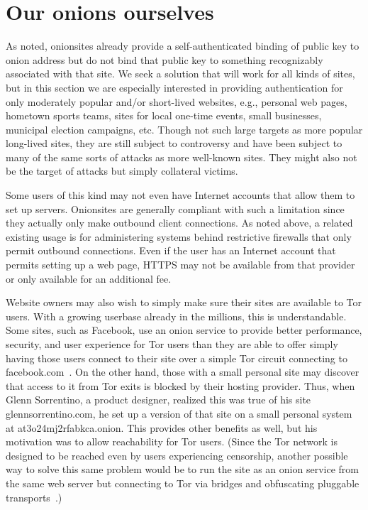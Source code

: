\documentclass[10pt, conference, compsocconf]{styles/IEEEtran}
\begin{document}
\section{Our onions ourselves}
\label{ourselves}

As noted, onionsites already provide a self-authenticated binding of
public key to onion address but do not bind that public key to
something recognizably associated with that site.  We seek a solution
that will work for all kinds of sites, but in this section we are
especially interested in providing authentication for only moderately
popular and/or short-lived websites, e.g., personal web pages,
hometown sports teams, sites for local one-time events, small
businesses, municipal election campaigns, etc.  Though not such large
targets as more popular long-lived sites, they are still subject to
controversy and have been subject to many of the same sorts of attacks
as more well-known sites.  They might also not be the target of
attacks but simply collateral victims.

Some users of this kind may not even have Internet accounts that allow
them to set up servers. Onionsites are generally compliant with such a
limitation since they actually only make outbound client
connections. As noted above, a related existing usage is for
administering systems behind restrictive firewalls that only permit
outbound connections.  Even if the user has an Internet account that
permits setting up a web page, HTTPS may not be available from that
provider or only available for an additional fee.

Website owners may also wish to simply make sure their sites are
available to Tor users. With a growing userbase already in the
millions, this is understandable.  Some sites, such as Facebook, use an
onion service to provide better performance, security, and user
experience for Tor users than they are able to offer simply having
those users connect to their site over a simple Tor circuit connecting
to facebook.com~\cite{7686-and-all}. On the other hand, those with a
small personal site may discover that access to it from Tor exits is
blocked by their hosting provider.  Thus, when Glenn Sorrentino, a
product designer, realized this was true of his site glennsorrentino.com,
he set up a version of that site on a small personal system at
at3o24mj2rfabkca.onion. This provides other benefits as well, but his
motivation was to allow reachability for Tor users. (Since the Tor network
is designed to be reached even by users experiencing censorship,
another possible way to solve this same problem would be to run the
site as an onion service from the same web server but
connecting to Tor via bridges and obfuscating pluggable
transports~\cite{bridges}.)
\end{document}
